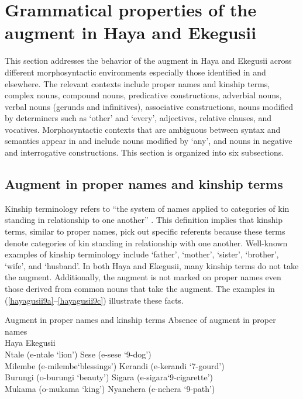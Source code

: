 \documentclass[output=paper]{langscibook}
\begin{document}
\section{Grammatical properties of the augment in Haya and Ekegusii}\label{sec:choti:4}\largerpage
This section addresses the behavior of the augment in Haya and Ekegusii across different morphosyntactic environments especially those identified in \citet{blois1970augment} and elsewhere. The relevant contexts include proper names and kinship terms, complex nouns, compound nouns, predicative constructions, adverbial nouns, verbal nouns (gerunds and infinitives), associative constructions, nouns modified by determiners such as ‘other’ and ‘every’, adjectives, relative clauses, and vocatives. Morphosyntactic contexts that are ambiguous between syntax and semantics appear in  and include nouns modified by ‘any’, and nouns in negative and interrogative constructions. This section is organized into six subsections.

\subsection{Augment in proper names and kinship terms}\label{sec:choti:4.1}
Kinship terminology refers to “the system of names applied to categories of kin standing in relationship to one another” \citep{britannica2017}. This definition implies that kinship terms, similar to proper names, pick out specific referents because these terms denote categories of kin standing in relationship with one another. Well-known examples of kinship terminology include ‘father’, ‘mother’, ‘sister’, ‘brother’, ‘wife’, and ‘husband’. In both Haya and Ekegusii, many kinship terms do not take the augment. Additionally, the augment is not marked on proper names even those derived from common nouns that take the augment. The examples in (\ref{hayagusii9a}--\ref{hayagusii9c}) illustrate these facts.


\ea Augment in proper names and kinship terms
\label{hayagusii9}
  \ea\label{hayagusii9a} Absence of augment in proper names \\
    \glllll Haya	 {}				Ekegusii {} \\
      Ntale 		{(e-ntale ‘lion’)}	         Sese  {(e-sese ‘9-dog’)} \\
      Milembe 	{(e-milembe`blessings')}	 Kerandi  {(e-kerandi ‘7-gourd’)} \\
      Burungi 	{(o-burungi ‘beauty’)}		Sigara  {(e-sigara‘9-cigarette’)} \\
      Mukama 	{(o-mukama ‘king’)}		Nyanchera  {(e-nchera ‘9-path’)} \\
\end{document}
